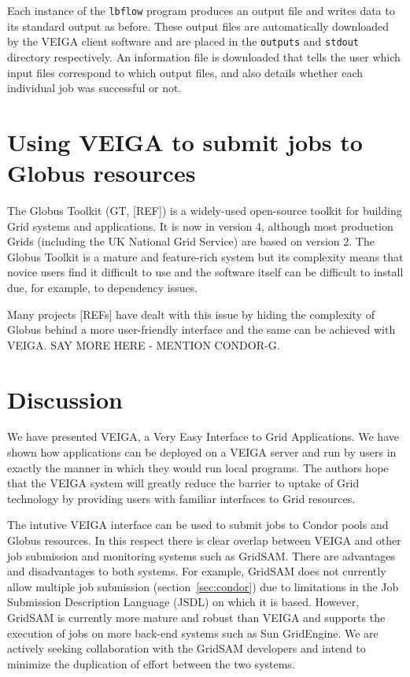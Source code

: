 \documentclass[a4paper]{article}
\begin{document}
\begin{multicols}{2}
Each instance of the {\tt lbflow} program produces an output file and writes data to its standard output as before.  These output files are automatically downloaded by the VEIGA client software and are placed in the {\tt outputs} and {\tt stdout} directory respectively.  An information file is downloaded that tells the user which input files correspond to which output files, and also details whether each individual job was successful or not.

\section{Using VEIGA to submit jobs to Globus resources}
The Globus Toolkit (GT, [REF]) is a widely-used open-source toolkit for building Grid systems and applications.  It is now in version 4, although most production Grids (including the UK National Grid Service) are based on version 2.  The Globus Toolkit is a mature and feature-rich system but its complexity means that novice users find it difficult to use and the software itself can be difficult to install due, for example, to dependency issues.

Many projects [REFs] have dealt with this issue by hiding the complexity of Globus behind a more user-friendly interface and the same can be achieved with VEIGA.  SAY MORE HERE - MENTION CONDOR-G.

\section{Discussion}
We have presented VEIGA, a Very Easy Interface to Grid Applications. We have shown how applications can be deployed on a VEIGA server and run by users in exactly the manner in which they would run local programs.  The authors hope that the VEIGA system will greatly reduce the barrier to uptake of Grid technology by providing users with familiar interfaces to Grid resources.

The intutive VEIGA interface can be used to submit jobs to Condor pools and Globus resources.  In this respect there is clear overlap between VEIGA and other job submission and monitoring systems such as GridSAM.  There are advantages and disadvantages to both systems.  For example, GridSAM does not currently allow multiple job submission (section~\ref{sec:condor}) due to limitations in the Job Submission Description Language (JSDL) on which it is based.  However, GridSAM is currently more mature and robust than VEIGA and supports the execution of jobs on more back-end systems such as Sun GridEngine.  We are actively seeking collaboration with the GridSAM developers and intend to minimize the duplication of effort between the two systems.


\end{multicols}
\end{document}
